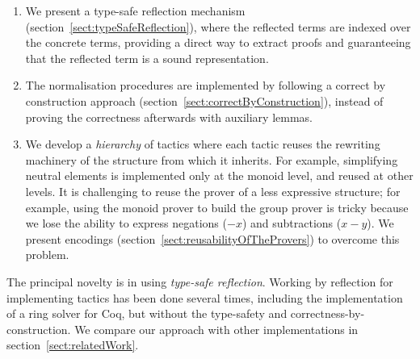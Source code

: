 \begin{enumerate}

\item We present a type-safe reflection mechanism
(section~\ref{sect:typeSafeReflection}), where the reflected terms are indexed
over the concrete terms, providing a direct way to extract proofs and
guaranteeing that the reflected term is a sound representation.

\item The normalisation procedures are implemented by following a correct by
construction approach (section~\ref{sect:correctByConstruction}), instead of proving the correctness afterwards with
auxiliary lemmas. 

\item We develop a \emph{hierarchy} of tactics where each tactic reuses the
rewriting machinery of the structure from which it inherits.  For
example, simplifying neutral elements is implemented only at the monoid level,
and reused at other levels.
It is challenging
to reuse the prover of a less expressive structure; for
example, using the monoid prover to build the group prover is 
tricky because
we lose the ability to express negations ($-x$) and
subtractions ($x-y$). We present encodings
(section~\ref{sect:reusabilityOfTheProvers}) to overcome this problem.

\end{enumerate}

The principal novelty is in using 
\emph{type-safe reflection}.  Working by reflection for implementing tactics
has been done several times, including the implementation of a ring solver
for Coq, but without the type-safety and
correctness-by-construction. We compare our approach with other
implementations in section~\ref{sect:relatedWork}.



